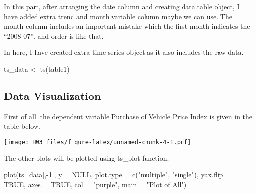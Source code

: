 \documentclass[
]{article}
\newenvironment{Shaded}{\begin{snugshade}}{\end{snugshade}}
\newcommand{\AttributeTok}[1]{\textcolor[rgb]{0.77,0.63,0.00}{#1}}
\newcommand{\ConstantTok}[1]{\textcolor[rgb]{0.00,0.00,0.00}{#1}}
\newcommand{\DecValTok}[1]{\textcolor[rgb]{0.00,0.00,0.81}{#1}}
\newcommand{\FunctionTok}[1]{\textcolor[rgb]{0.00,0.00,0.00}{#1}}
\newcommand{\NormalTok}[1]{#1}
\newcommand{\OtherTok}[1]{\textcolor[rgb]{0.56,0.35,0.01}{#1}}
\newcommand{\SpecialCharTok}[1]{\textcolor[rgb]{0.00,0.00,0.00}{#1}}
\newcommand{\StringTok}[1]{\textcolor[rgb]{0.31,0.60,0.02}{#1}}
\begin{document}
In this part, after arranging the date column and creating data.table
object, I have added extra trend and month variable column maybe we can
use. The month column includes an important mistake which the first
month indicates the ``2008-07'', and order is like that.

In here, I have created extra time series object as it also includes the
raw data.

\begin{Shaded}
\begin{Highlighting}[]
\NormalTok{ts\_data }\OtherTok{\textless{}{-}} \FunctionTok{ts}\NormalTok{(table1)}
\end{Highlighting}
\end{Shaded}

\hypertarget{data-visualization}{%
\subsection{Data Visualization}\label{data-visualization}}

First of all, the dependent variable Purchase of Vehicle Price Index is
given in the table below.

\begin{Shaded}
\end{Shaded}

\texttt{[image: HW3\_files/figure-latex/unnamed-chunk-4-1.pdf]}

The other plots will be plotted using ts\_plot function.

\begin{Shaded}
\begin{Highlighting}[]
\FunctionTok{plot}\NormalTok{(ts\_data[,}\SpecialCharTok{{-}}\DecValTok{1}\NormalTok{], }\AttributeTok{y =} \ConstantTok{NULL}\NormalTok{, }\AttributeTok{plot.type =} \FunctionTok{c}\NormalTok{(}\StringTok{"multiple"}\NormalTok{, }\StringTok{"single"}\NormalTok{), }\AttributeTok{yax.flip =} \ConstantTok{TRUE}\NormalTok{, }\AttributeTok{axes =} \ConstantTok{TRUE}\NormalTok{, }\AttributeTok{col =} \StringTok{"purple"}\NormalTok{, }\AttributeTok{main =} \StringTok{"Plot of All"}\NormalTok{)}
\end{Highlighting}
\end{Shaded}
\end{document}
